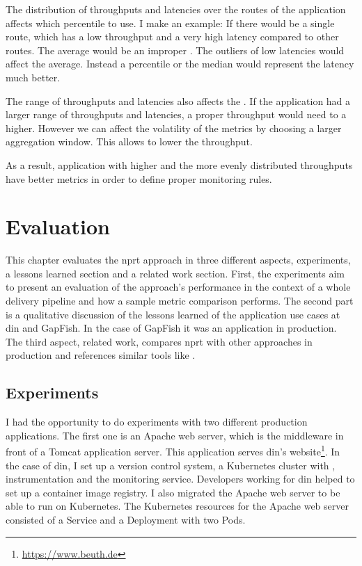 The distribution of throughputs and latencies over the routes of the application affects
which percentile to use. I make an example: If there would be a single route, which has a
low throughput and a very high latency compared to other routes. The average would be an
improper . The outliers of low latencies would affect the
average. Instead a percentile or the median would represent the latency much better.

The range of throughputs and latencies also affects the . If the
application had a larger range of throughputs and latencies, a proper throughput would
need to a higher. However we can affect the volatility of the metrics by choosing a larger
aggregation window. This allows to lower the throughput.

As a result, application with higher and the more evenly distributed throughputs have
better metrics in order to define proper monitoring rules.

\chapter{Evaluation}
\label{chap:eval}

This chapter evaluates the \gls{nprt} approach in three different aspects, experiments, a
lessons learned section and a related work section. First, the experiments aim to
present an evaluation of the approach's performance in the context of a whole delivery
pipeline and how a sample metric comparison performs. The second part is a qualitative
discussion of the lessons learned of the application use cases at \gls{din} and GapFish.
In the case of GapFish it was an application in production. The third aspect, related work,
compares \gls{nprt} with other approaches in production and references similar tools like
\deployer{}.

\section{Experiments}

I had the opportunity to do experiments with two different production applications. The
first one is an Apache web server, which is the middleware in front of a Tomcat
application server. This application serves \gls{din}'s
website\footnote{\url{https://www.beuth.de}}. In the case of \gls{din}, I set up a version
control system, a Kubernetes cluster with \deployer{}, instrumentation and the monitoring
service. Developers working for \gls{din} helped to set up a container image
registry. I also migrated the Apache web server to be able to run on Kubernetes. The
Kubernetes resources for the Apache web server consisted of a Service and a Deployment
with two Pods.

